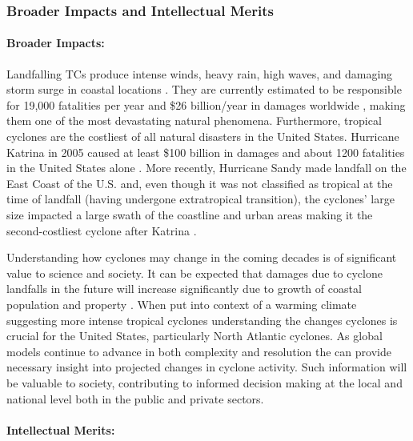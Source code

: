 \documentclass[11pt]{article}
\begin{document}
\subsubsection{Broader Impacts and Intellectual Merits}

\paragraph{Broader Impacts:}  

Landfalling TCs produce intense winds, heavy rain, high waves, and damaging storm surge in coastal locations \citep{EmanuelDivineWind}. They are currently estimated to be responsible for 19,000 fatalities per year and \$26 billion/year in damages worldwide \citep{Mendelsohn2012}, making them one of the most devastating natural phenomena. Furthermore, tropical cyclones are the costliest of all natural disasters in the United States\citep{Pielke1998}. Hurricane Katrina in 2005 caused at least \$100 billion in damages and about 1200 fatalities in the United States alone \citep{Blake2011}. More recently, Hurricane Sandy made landfall on the East Coast of the U.S. and, even though it was not classified as tropical at the time of landfall (having undergone extratropical transition), the cyclones' large size impacted a large swath of the coastline and urban areas making it the second-costliest cyclone after Katrina \citep{Blake2013}.  

Understanding how cyclones may change in the coming decades is of significant value to science and society. It can be expected that damages due to cyclone landfalls in the future will increase significantly due to growth of coastal population and property \citep{Pielke2008}. When put into context of a warming climate suggesting more intense tropical cyclones \citep{Knutson2010} understanding the changes cyclones is crucial for the United States, particularly North Atlantic cyclones. As global models continue to advance in both complexity and resolution the can provide necessary insight into projected changes in cyclone activity.  Such information will be valuable to society, contributing to informed decision making at the local and national level both in the public and private sectors.

\paragraph{Intellectual Merits:}  
\end{document}
